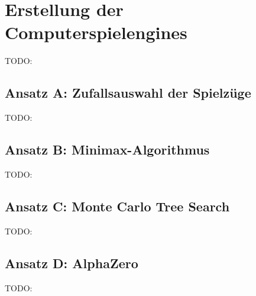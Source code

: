 \chapter{Erstellung der Computerspielengines}
\label{chapter:erstellung-der-computerspielengines}

TODO:

\section{Ansatz A: Zufallsauswahl der Spielzüge}
\label{chapter:ansatz-a}

TODO:

\section{Ansatz B: Minimax-Algorithmus}
\label{chapter:ansatz-b}

TODO:

\section{Ansatz C: Monte Carlo Tree Search}
\label{chapter:ansatz-c}

TODO:

\section{Ansatz D: AlphaZero}
\label{chapter:ansatz-d}

TODO:
